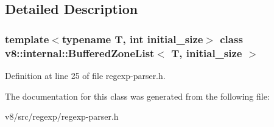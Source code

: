 \subsection{Detailed Description}
\subsubsection*{template$<$typename T, int initial\+\_\+size$>$\newline
class v8\+::internal\+::\+Buffered\+Zone\+List$<$ T, initial\+\_\+size $>$}



Definition at line 25 of file regexp-\/parser.\+h.



The documentation for this class was generated from the following file\+:\begin{DoxyCompactItemize}
\item 
v8/src/regexp/regexp-\/parser.\+h\end{DoxyCompactItemize}
